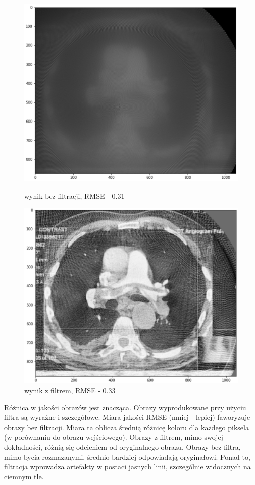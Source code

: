 \documentclass[polish,polish,a4paper]{article}
\begin{document}
			\begin{figure}[!h]
				\centering
				\begin{minipage}{0.45\linewidth}
					\includegraphics[width=\linewidth]{img/saddle_nf.png}
					\caption{wynik bez filtracji, RMSE - 0.31}
				\end{minipage}
				\hfill
				\begin{minipage}{0.45\linewidth}
					\includegraphics[width=\linewidth]{img/saddle_f.png}
					\caption{wynik z filtrem, RMSE - 0.33}
				\end{minipage}
			\end{figure}
			Różnica w jakości obrazów jest znacząca. 
			Obrazy wyprodukowane przy użyciu filtra są wyraźne i szczegółowe. 
			Miara jakości RMSE (mniej - lepiej) faworyzuje obrazy bez filtracji. 
			Miara ta oblicza średnią różnicę koloru dla każdego piksela (w porównaniu do obrazu wejściowego). 
			Obrazy z filtrem, mimo swojej dokładności, 
			różnią się odcieniem od oryginalnego obrazu. 
			Obrazy bez filtra, mimo bycia rozmazanymi, 
			średnio bardziej odpowiadają oryginałowi. 
			Ponad to, filtracja wprowadza artefakty w postaci jasnych linii, 
			szczególnie widocznych na ciemnym tle.
			
\end{document}
